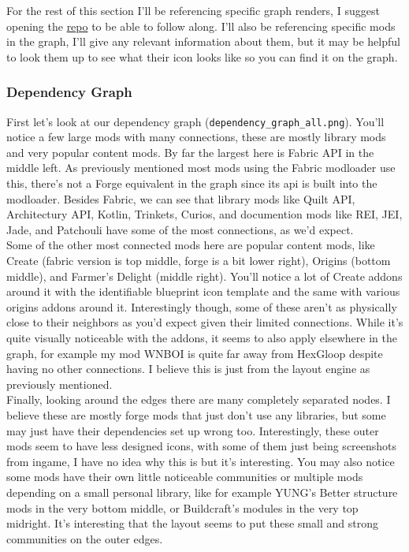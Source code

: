 \documentclass[a4paper,11pt, twocolumn]{article}
\begin{document}
For the rest of this section I'll be referencing specific graph renders, I suggest opening the \href{https://github.com/SamsTheNerd/minegraphtmods/tree/main/demos}{repo} to be able to follow along. I'll also be referencing specific mods in the graph, I'll give any relevant information about them, but it may be helpful to look them up to see what their icon looks like so you can find it on the graph.

\subsubsection{Dependency Graph}

First let's look at our dependency graph (\verb|dependency_graph_all.png|). You'll notice a few large mods with many connections, these are mostly library mods and very popular content mods. By far the largest here is Fabric API in the middle left. As previously mentioned most mods using the Fabric modloader use this, there's not a Forge equivalent in the graph since its api is built into the modloader. Besides Fabric, we can see that library mods like Quilt API, Architectury API, Kotlin, Trinkets, Curios, and documention mods like REI, JEI, Jade, and Patchouli have some of the most connections, as we'd expect.\\

Some of the other most connected mods here are popular content mods, like Create (fabric version is top middle, forge is a bit lower right), Origins (bottom middle), and Farmer's Delight (middle right). You'll notice a lot of Create addons around it with the identifiable blueprint icon template and the same with various origins addons around it. Interestingly though, some of these aren't as physically close to their neighbors as you'd expect given their limited connections. While it's quite visually noticeable with the addons, it seems to also apply elsewhere in the graph, for example my mod WNBOI is quite far away from HexGloop despite having no other connections. I believe this is just from the layout engine as previously mentioned.\\

Finally, looking around the edges there are many completely separated nodes. I believe these are mostly forge mods that just don't use any libraries, but some may just have their dependencies set up wrong too. Interestingly, these outer mods seem to have less designed icons, with some of them just being screenshots from ingame, I have no idea why this is but it's interesting. You may also notice some mods have their own little noticeable communities or multiple mods depending on a small personal library, like for example YUNG's Better structure mods in the very bottom middle, or Buildcraft's modules in the very top midright. It's interesting that the layout seems to put these small and strong communities on the outer edges.
\end{document}
